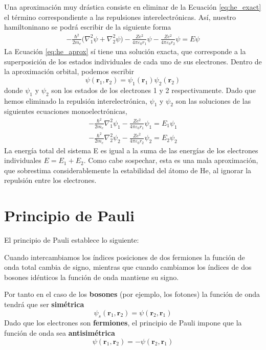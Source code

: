 Una aproximación muy drástica consiste en eliminar de la Ecuación 
\ref{eq:he_exact} el término correspondiente a las repulsiones 
interelectrónicas. Así, nuestro hamiltoninano se podrá escribir
de la siguiente forma
\begin{align}
    -\frac{\hbar^2}{2m_e}\big(\nabla_1^2\psi + \nabla_2^2\psi\big)
    -\frac{Ze^2}{4\pi \varepsilon_0r_1}\psi 
    -\frac{Ze^2}{4\pi \varepsilon_0r_2}\psi 
    = E\psi
\label{eq:he_aprox}    
\end{align}
La Ecuación \ref{eq:he_aprox} sí tiene una solución exacta, que 
corresponde a la superposición de los estados individuales de 
cada uno de sus electrones. Dentro de la aproximación orbital, 
podemos escribir 
\begin{equation}
    \psi(\mathbf{r}_1,\mathbf{r}_2)=\psi_1(\mathbf{r}_1)\psi_2(\mathbf{r}_2)
\end{equation}
donde $\psi_1$ y $\psi_2$ son los estados de los electrones  
1 y 2 respectivamente. Dado que hemos eliminado la repulsión
interelectrónica, $\psi_1$ y $\psi_2$ son las soluciones de 
las siguientes ecuaciones monoelectrónicas,
\begin{align}
    -\frac{\hbar^2}{2m_e}\nabla_1^2\psi_1 -\frac{Ze^2}{4\pi \varepsilon_0r_1}\psi_1
    = E_1\psi_1\\
    -\frac{\hbar^2}{2m_e}\nabla_2^2\psi_2 -\frac{Ze^2}{4\pi \varepsilon_0r_2}\psi_2
    = E_2\psi_2
\label{eq:he_aprox}    
\end{align}
La energía total del sistema Ε es igual a la suma de las 
energías de los electrones individuales $E=E_1 + E_2$. Como
cabe sospechar, esta es una mala aproximación, que sobrestima
considerablemente la estabilidad del átomo de He, al ignorar 
la repulsión entre los electrones.


\section{Principio de Pauli}
El principio de Pauli establece lo siguiente: 
\begin{displayquote}
Cuando intercambiamos los índices posiciones de dos fermiones 
la función de onda total cambia de signo, mientras que cuando
cambiamos los índices de dos bosones idénticos la función de onda
mantiene su signo.
\end{displayquote}
Por tanto en el caso de los \textbf{bosones} (por ejemplo, los fotones)
la función de onda tendrá que ser
\textbf{simétrica}
\begin{equation}
    \psi_s(\mathbf{r}_1,\mathbf{r}_2)=\psi(\mathbf{r}_2,\mathbf{r}_1)
\end{equation}
Dado que los electrones son \textbf{fermiones}, el principio de
Pauli impone que la función de onda sea \textbf{antisimétrica}
\begin{equation}
    \psi(\mathbf{r}_1,\mathbf{r}_2)=-\psi(\mathbf{r}_2,\mathbf{r}_1)
\end{equation}

